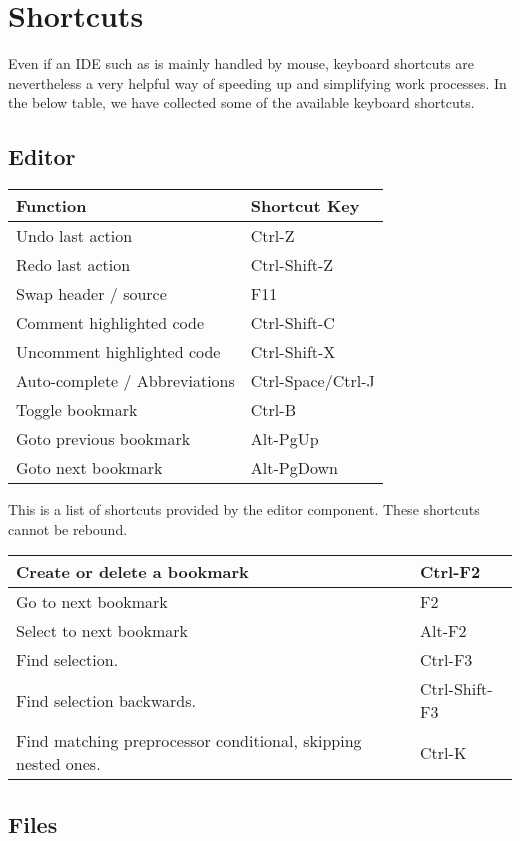 \section{Shortcuts}

Even if an IDE such as \codeblocks is mainly handled by mouse, keyboard shortcuts are nevertheless a very helpful way of speeding up and simplifying work processes. In the below table, we have collected some of the available keyboard shortcuts.

\subsection{Editor}

\begin{tabular}{|l|l|}\hline
Function		&	Shortcut Key\\ \hline
Undo last action 	&	Ctrl-Z\\ \hline
Redo last action 	&	Ctrl-Shift-Z\\ \hline
Swap header / source 	&	F11\\ \hline
Comment highlighted code &	Ctrl-Shift-C\\ \hline
Uncomment highlighted code & 	Ctrl-Shift-X\\ \hline
Auto-complete / Abbreviations & 	Ctrl-Space/Ctrl-J\\ \hline
Toggle bookmark 	&	Ctrl-B\\ \hline
Goto previous bookmark 	&	Alt-PgUp\\ \hline
Goto next bookmark 	&	Alt-PgDown\\ \hline
\end{tabular}

This is a list of shortcuts provided by the \codeblocks editor component. These shortcuts cannot be rebound.

\begin{tabular}{|l|l|}\hline
Create or delete a bookmark	&	Ctrl-F2\\ \hline
Go to next bookmark		&	F2\\ \hline
Select to next bookmark		&	Alt-F2\\ \hline
Find selection.			& 	Ctrl-F3\\ \hline
Find selection backwards. 	&	Ctrl-Shift-F3\\ \hline
Find matching preprocessor conditional, skipping nested ones. &	Ctrl-K\\ \hline
\end{tabular}

\subsection{Files}

